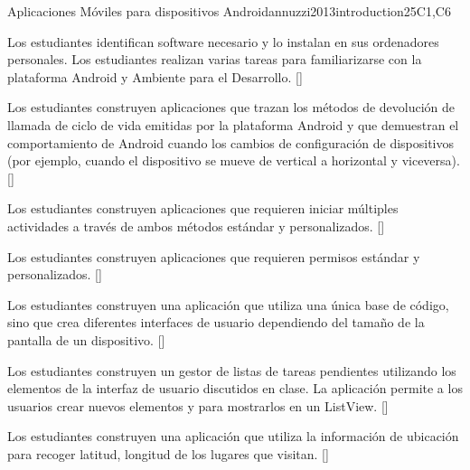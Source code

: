 \begin{syllabus}
\begin{unit}{Aplicaciones Móviles para dispositivos Android}{}{annuzzi2013introduction}{25}{C1,C6}
\begin{learningoutcomes}
    \item Los estudiantes identifican software necesario y lo instalan en sus ordenadores personales.
          Los estudiantes realizan varias tareas para familiarizarse con la plataforma Android y Ambiente para el Desarrollo. [\Usage]
    \item Los estudiantes construyen aplicaciones que trazan los métodos de devolución de llamada de ciclo de
          vida emitidas por la plataforma Android y que demuestran el comportamiento de Android cuando los cambios de configuración de
          dispositivos (por ejemplo, cuando el dispositivo se mueve de vertical a horizontal y viceversa). [\Usage]
    \item Los estudiantes construyen aplicaciones que requieren iniciar múltiples actividades a través de ambos métodos estándar y personalizados. [\Usage]
    \item Los estudiantes construyen aplicaciones que requieren permisos estándar y personalizados. [\Usage]
    \item Los estudiantes construyen una aplicación que utiliza una única base de código, sino que crea diferentes interfaces de
          usuario dependiendo del tamaño de la pantalla de un dispositivo. [\Usage]
    \item Los estudiantes construyen un gestor de listas de tareas pendientes utilizando los elementos de la interfaz de
          usuario discutidos en clase. La aplicación permite a los usuarios crear nuevos elementos y para mostrarlos en un ListView. [\Usage]
    \item Los estudiantes construyen una aplicación que utiliza la información de ubicación para recoger latitud, longitud de los lugares que visitan. [\Usage]
\end{learningoutcomes}
\end{unit}

\begin{coursebibliography}
\end{coursebibliography}

\end{syllabus}
